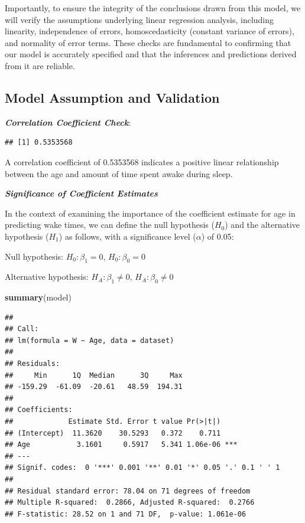 \documentclass[
]{article}
\newenvironment{Shaded}{\begin{snugshade}}{\end{snugshade}}
\newcommand{\FunctionTok}[1]{\textcolor[rgb]{0.13,0.29,0.53}{\textbf{#1}}}
\newcommand{\NormalTok}[1]{#1}
\newcommand{\SpecialCharTok}[1]{\textcolor[rgb]{0.81,0.36,0.00}{\textbf{#1}}}
\begin{document}
Importantly, to ensure the integrity of the conclusions drawn from this
model, we will verify the assumptions underlying linear regression
analysis, including linearity, independence of errors, homoscedasticity
(constant variance of errors), and normality of error terms. These
checks are fundamental to confirming that our model is accurately
specified and that the inferences and predictions derived from it are
reliable.

\subsection{Model Assumption and
Validation}\label{model-assumption-and-validation-1}

\textbf{\emph{Correlation Coefficient Check}}:

\begin{Shaded}
\end{Shaded}

\begin{verbatim}
## [1] 0.5353568
\end{verbatim}

A correlation coefficient of 0.5353568 indicates a positive linear
relationship between the age and amount of time spent awake during
sleep.

\textbf{\emph{Significance of Coefficient Estimates}}

In the context of examining the importance of the coefficient estimate
for age in predicting wake times, we can define the null hypothesis
(\(H_0\)) and the alternative hypothesis (\(H_1\)) as follows, with a
significance level (\(\alpha\)) of 0.05:

Null hypothesis: \(H_{0}: \beta_{1} = 0\), \(H_{0}: \beta_{0} = 0\)

Alternative hypothesis: \(H_{A}: \beta_{1} \neq 0\),
\(H_{A}: \beta_{0} \neq 0\)

\begin{Shaded}
\begin{Highlighting}[]
\FunctionTok{summary}\NormalTok{(model)}
\end{Highlighting}
\end{Shaded}

\begin{verbatim}
## 
## Call:
## lm(formula = W ~ Age, data = dataset)
## 
## Residuals:
##     Min      1Q  Median      3Q     Max 
## -159.29  -61.09  -20.61   48.59  194.31 
## 
## Coefficients:
##             Estimate Std. Error t value Pr(>|t|)    
## (Intercept)  11.3620    30.5293   0.372    0.711    
## Age           3.1601     0.5917   5.341 1.06e-06 ***
## ---
## Signif. codes:  0 '***' 0.001 '**' 0.01 '*' 0.05 '.' 0.1 ' ' 1
## 
## Residual standard error: 78.04 on 71 degrees of freedom
## Multiple R-squared:  0.2866, Adjusted R-squared:  0.2766 
## F-statistic: 28.52 on 1 and 71 DF,  p-value: 1.061e-06
\end{verbatim}
\end{document}
